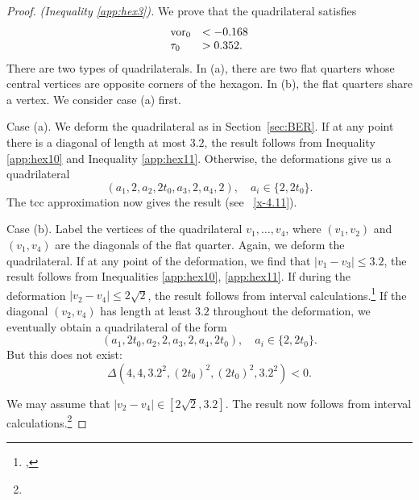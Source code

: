 \begin{proof}
{\it (Inequality \ref{app:hex3}).}
 We prove that the quadrilateral
satisfies
    $$
    \begin{array}{lll}
    \operatorname{vor}_0 &< -0.168\\
    \tau_0 &> 0.352.\\
    \end{array}
    $$
There are two types of quadrilaterals.  In (a), there are two flat
quarters whose central vertices are opposite corners of the
hexagon.  In (b), the flat quarters share a vertex.
  We consider case (a) first.

Case (a). We deform the quadrilateral as in
Section~\ref{sec:BER}.%
If at any point there is a
diagonal of length at most $3.2$, the result follows from
Inequality \ref{app:hex10} and Inequality \ref{app:hex11}.
Otherwise, the deformations give us a quadrilateral
    $$(a_1,2,a_2,2t_0,a_3,2,a_4,2), \quad a_i \in\{2,2t_0\}.$$
The tcc approximation now gives the result (see
\Chap~\ref{x-4.11}).

Case (b). Label the vertices of the quadrilateral
 $v_1,\ldots,v_4$, where $(v_1,v_2)$ and $(v_1,v_4)$
are the diagonals of the flat quarter.  Again, we deform the
quadrilateral.  If at any point of the deformation, we find that
$|v_1-v_3|\le 3.2$, the result follows from Inequalities
\ref{app:hex10}, \ref{app:hex11}. If during the deformation
$|v_2-v_4|\le2\sqrt2$, the result follows from
interval calculations.\footnote{,} %
If the diagonal $(v_2,v_4)$ has length at least
$3.2$ throughout the deformation, we eventually obtain a
quadrilateral of the form
    $$(a_1,2t_0,a_2,2,a_3,2,a_4,2t_0),\quad a_i\in\{2,2t_0\}.$$
But this does not exist:
$$\Delta(4,4,3.2^2,(2t_0)^2,(2t_0)^2,3.2^2)<0.$$

We may assume that $|v_2-v_4|\in[2\sqrt2,3.2]$.  The result now
follows from interval calculations.\footnote{} %
\end{proof}

